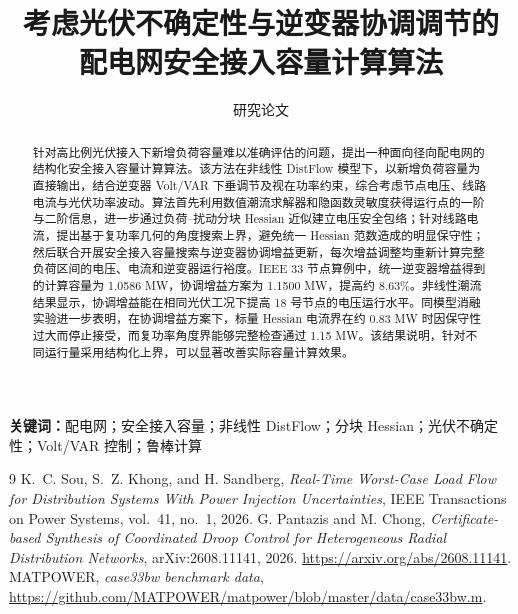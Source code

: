 \documentclass[UTF8,11pt,a4paper,fontset=none]{ctexart}
\title{\bfseries 考虑光伏不确定性与逆变器协调调节的\\配电网安全接入容量计算算法}
\author{研究论文}
\date{}
\begin{document}
\maketitle
\begin{abstract}
针对高比例光伏接入下新增负荷容量难以准确评估的问题，提出一种面向径向配电网的结构化安全接入容量计算算法。该方法在非线性 DistFlow 模型下，以新增负荷容量为直接输出，结合逆变器 Volt/VAR 下垂调节及视在功率约束，综合考虑节点电压、线路电流与光伏功率波动。算法首先利用数值潮流求解器和隐函数灵敏度获得运行点的一阶与二阶信息，进一步通过负荷--扰动分块 Hessian 近似建立电压安全包络；针对线路电流，提出基于复功率几何的角度搜索上界，避免统一 Hessian 范数造成的明显保守性；然后联合开展安全接入容量搜索与逆变器协调增益更新，每次增益调整均重新计算完整负荷区间的电压、电流和逆变器运行裕度。IEEE 33 节点算例中，统一逆变器增益得到的计算容量为 1.0586 MW，协调增益方案为 1.1500 MW，提高约 8.63\%。非线性潮流结果显示，协调增益能在相同光伏工况下提高 18 号节点的电压运行水平。同模型消融实验进一步表明，在协调增益方案下，标量 Hessian 电流界在约 0.83 MW 时因保守性过大而停止接受，而复功率角度界能够完整检查通过 1.15 MW。该结果说明，针对不同运行量采用结构化上界，可以显著改善实际容量计算效果。
\end{abstract}
\noindent\textbf{关键词：}配电网；安全接入容量；非线性 DistFlow；分块 Hessian；光伏不确定性；Volt/VAR 控制；鲁棒计算




\begin{thebibliography}{9}
K.~C. Sou, S.~Z. Khong, and H. Sandberg,
\emph{Real-Time Worst-Case Load Flow for Distribution Systems With Power Injection Uncertainties},
IEEE Transactions on Power Systems, vol.~41, no.~1, 2026.
G. Pantazis and M. Chong,
\emph{Certificate-based Synthesis of Coordinated Droop Control for Heterogeneous Radial Distribution Networks},
arXiv:2608.11141, 2026. \url{https://arxiv.org/abs/2608.11141}.
MATPOWER, \emph{case33bw benchmark data},
\url{https://github.com/MATPOWER/matpower/blob/master/data/case33bw.m}.
\end{thebibliography}
\end{document}
